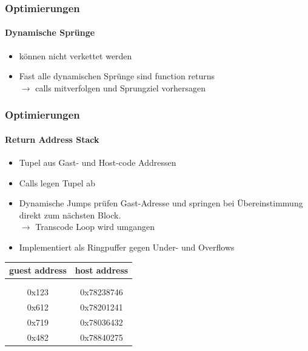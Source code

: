 \begin{frame}
	\frametitle{Optimierungen}
	\framesubtitle{Dynamische Sprünge}
	\begin{itemize}
		\item können nicht verkettet werden
		\item Fast alle dynamischen Sprünge sind function returns\\
		$\rightarrow$ calls mitverfolgen und Sprungziel vorhersagen
	\end{itemize}
\end{frame}

\begin{frame}
	\frametitle{Optimierungen}
	\framesubtitle{Return Address Stack}
	
	\begin{minipage}[t]{.47\textwidth}
		\begin{itemize}
			\item Tupel aus Gast- und Host-code Addressen
			\pause
			\item Calls legen Tupel ab
			\item Dynamische Jumps prüfen Gast-Adresse und springen bei Übereinstimmung direkt zum nächsten Block. \\
			\pause
			$\rightarrow$ Transcode Loop wird umgangen
			\pause
			\item Implementiert als Ringpuffer gegen Under- und Overflows
			
		\end{itemize}
	\end{minipage}
	\begin{minipage}[t]{.47\textwidth}
		\vspace{0.1cm}
		\centering
		\begin{tabular} { |c|c| }
			\hline
			guest address & host address \\ [0.5ex]
			\hline\hline
			  & \\
			 \hline
			  & \\
			 \hline
			0x123 & 0x78238746 \\
			\hline
			0x612 & 0x78201241 \\
			\hline
			0x719 & 0x78036432 \\
			\hline
			0x482 & 0x78840275 \\
			\hline
		\end{tabular}
	\end{minipage}
	
\end{frame}

